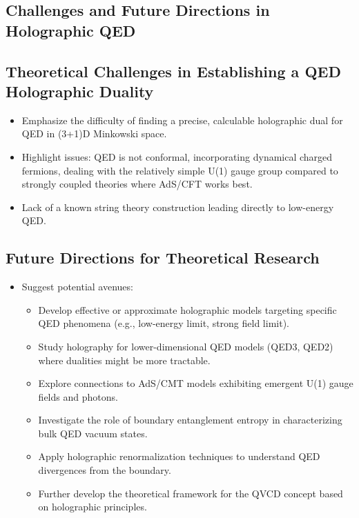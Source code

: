 \documentclass{amsart}
\begin{document}
\begin{itemize}
\section{Challenges and Future Directions in Holographic QED}

\subsection{Theoretical Challenges in Establishing a QED Holographic Duality}
\begin{itemize}
    \item Emphasize the difficulty of finding a precise, calculable holographic dual for QED in (3+1)D Minkowski space.
    \item Highlight issues: QED is not conformal, incorporating dynamical charged fermions, dealing with the relatively simple U(1) gauge group compared to strongly coupled theories where AdS/CFT works best.
    \item Lack of a known string theory construction leading directly to low-energy QED.
\end{itemize}

\subsection{Future Directions for Theoretical Research}
\begin{itemize}
    \item Suggest potential avenues:
        \begin{itemize}
            \item Develop effective or approximate holographic models targeting specific QED phenomena (e.g., low-energy limit, strong field limit).
            \item Study holography for lower-dimensional QED models (QED3, QED2) where dualities might be more tractable.
            \item Explore connections to AdS/CMT models exhibiting emergent U(1) gauge fields and photons.
            \item Investigate the role of boundary entanglement entropy in characterizing bulk QED vacuum states.
            \item Apply holographic renormalization techniques to understand QED divergences from the boundary.
            \item Further develop the theoretical framework for the QVCD concept based on holographic principles.
        \end{itemize}
\end{itemize}


\end{itemize}
\end{document}
